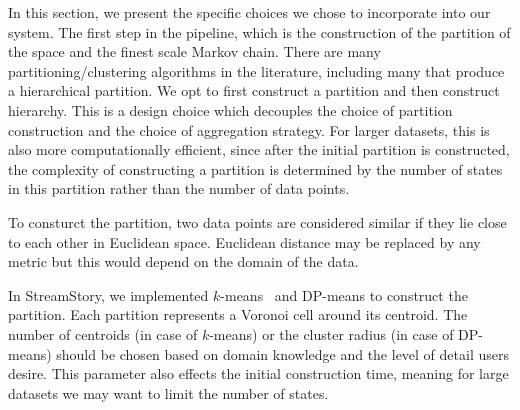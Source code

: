 In this section, we present the specific choices we chose to incorporate into our system.  
%
%
The first step in the pipeline, which is the construction of the partition of the space and the finest scale Markov chain.
There are many partitioning/clustering algorithms in the literature, including many that produce a hierarchical partition.%
We opt to first construct a partition and then construct hierarchy. This is a design choice which decouples the choice of partition construction and the choice of aggregation strategy.  For larger datasets, this is also more computationally efficient, since after the initial partition is constructed, the complexity of constructing a partition is determined by the number of states in this partition rather than the number of data points.  	


To consturct the partition, two data points are considered similar if they lie close
to each other in Euclidean space. Euclidean distance may be replaced by any metric but this would depend on the domain of the data.

In StreamStory, we implemented $k$-means~\cite{Maimon:2005:DMK:1088958} and DP-means \cite{DBLP:journals/corr/abs-1111-0352} to construct the partition. Each  
partition  represents a  Voronoi cell around its centroid. 
%
%
The number of centroids (in case of $k$-means) or the cluster radius (in case of DP-means) should
be chosen based on domain knowledge and the level of detail users desire. This parameter also effects the 
initial construction time, meaning for large datasets we may want to limit the number of states.

